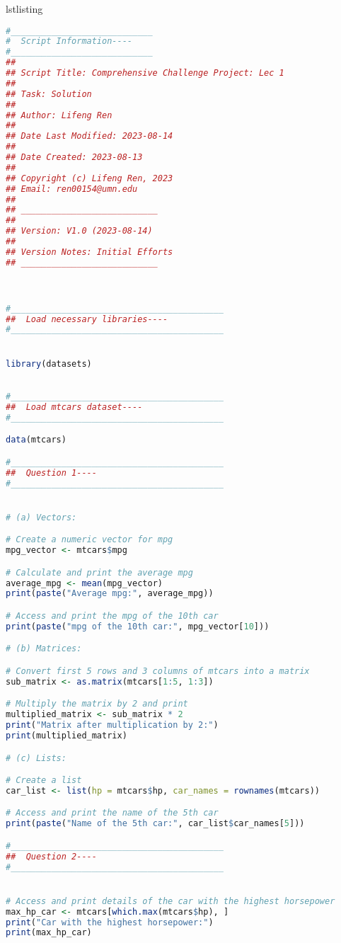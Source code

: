 \begin{frame}[fragile]{lstlisting}
\scriptsize
\begin{lstlisting}[language=R]
#____________________________
#  Script Information----
#____________________________
##
## Script Title: Comprehensive Challenge Project: Lec 1
##
## Task: Solution
##
## Author: Lifeng Ren
##
## Date Last Modified: 2023-08-14
##
## Date Created: 2023-08-13
##
## Copyright (c) Lifeng Ren, 2023
## Email: ren00154@umn.edu
##
## ___________________________
##
## Version: V1.0 (2023-08-14)
##   
## Version Notes: Initial Efforts
## ___________________________



#__________________________________________
##  Load necessary libraries----   
#__________________________________________


library(datasets)

  
#__________________________________________
##  Load mtcars dataset----   
#__________________________________________ 

data(mtcars)

#__________________________________________
##  Question 1----   
#__________________________________________ 


# (a) Vectors:

# Create a numeric vector for mpg
mpg_vector <- mtcars$mpg

# Calculate and print the average mpg
average_mpg <- mean(mpg_vector)
print(paste("Average mpg:", average_mpg))

# Access and print the mpg of the 10th car
print(paste("mpg of the 10th car:", mpg_vector[10]))

# (b) Matrices:

# Convert first 5 rows and 3 columns of mtcars into a matrix
sub_matrix <- as.matrix(mtcars[1:5, 1:3])

# Multiply the matrix by 2 and print
multiplied_matrix <- sub_matrix * 2
print("Matrix after multiplication by 2:")
print(multiplied_matrix)

# (c) Lists:

# Create a list
car_list <- list(hp = mtcars$hp, car_names = rownames(mtcars))

# Access and print the name of the 5th car
print(paste("Name of the 5th car:", car_list$car_names[5]))

#__________________________________________
##  Question 2----   
#__________________________________________ 


# Access and print details of the car with the highest horsepower
max_hp_car <- mtcars[which.max(mtcars$hp), ]
print("Car with the highest horsepower:")
print(max_hp_car)


\end{lstlisting}
\end{frame}

